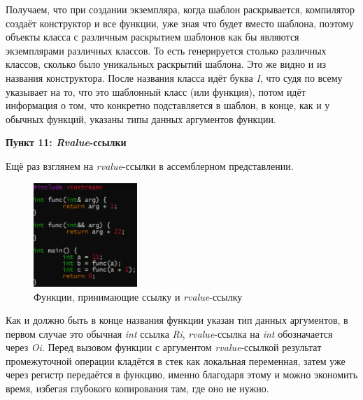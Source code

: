 \documentclass[a4paper,12pt]{article}
\begin{document}
Получаем, что при создании экземпляра, когда шаблон раскрывается, компилятор создаёт конструктор и все функции, уже зная что будет вместо шаблона, поэтому объекты класса с различным раскрытием шаблонов как бы являются экземплярами различных классов. То есть генерируется столько различных классов, сколько было уникальных раскрытий шаблона. Это же видно и из названия конструктора. После названия класса идёт буква \textit{I}, что судя по всему указывает на то, что это шаблонный класс (или функция), потом идёт информация о том, что конкретно подставляется в шаблон, в конце, как и у обычных функций, указаны типы данных аргументов функции.  

\textbf{Пункт 11: \textit{Rvalue}-ссылки}

Ещё раз взглянем на \textit{rvalue}-ссылки в ассемблерном представлении.

\begin{figure}[H]\label{fig: ref и rvalue ref код}
    \centering
    \includegraphics[width = 0.35\textwidth]{Rvalue-ссылки код.png}
    \caption{Функции, принимающие ссылку и \textit{rvalue}-ссылку}
\end{figure}

\begin{figure}[H]\label{fig: Названия ref и rvalue ref функций}
\end{figure}
Как и должно быть в конце названия функции указан тип данных аргументов, в первом случае это обычная \textit{int} ссылка \textit{Ri}, \textit{rvalue}-ссылка на \textit{int} обозначается через \textit{Oi}. Перед вызовом функции с аргументом \textit{rvalue}-ссылкой результат промежуточной операции кладётся в стек как локальная переменная, затем уже через регистр передаётся в функцию, именно благодаря этому и можно экономить время, избегая глубокого копирования там, где оно не нужно.  
\end{document}
